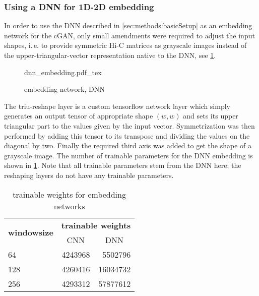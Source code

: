 \subsubsection{Using a DNN for 1D-2D embedding} \label{sec:methods:dnn-embedding}
In order to use the DNN described in \cref{sec:methods:basicSetup} as an embedding network
for the cGAN, only small amendments were required to adjust the input shapes,
i.\,e. to provide symmetric Hi-C matrices as grayscale images instead of the upper-triangular-vector representation
native to the DNN, see \cref{fig:methods:dnn-embedding}.
\begin{figure}[p]
    \scriptsize
    \centering
    {dnn_embedding.pdf_tex}
    \caption{embedding network, DNN} \label{fig:methods:dnn-embedding}
\end{figure}
The triu-reshape layer is a custom tensorflow network layer which simply generates an output tensor
of appropriate shape $(w,w)$ and sets its upper triangular part to the values given by the input vector.
Symmetrization was then performed by adding this tensor to its transpose and dividing the values on the diagonal by two.
Finally the required third axis was added to get the shape of a grayscale image.
The number of trainable parameters for the DNN embedding is shown in \cref{tab:methods:embedding_network_params}.
Note that all trainable parameters stem from the DNN here; the reshaping layers do not have any trainable parameters.
\begin{table}[htbp]
\centering
\begin{tabular}{lrr}
\hline
\multicolumn{1}{c}{\multirow{2}{*}{\textbf{windowsize}}} & \multicolumn{2}{c}{\textbf{trainable weights}}    \\
\multicolumn{1}{c}{}                                     & \multicolumn{1}{c}{CNN} & \multicolumn{1}{c}{DNN} \\ \hline
64                                                       & 4243968                 & 5502796                 \\
128                                                      & 4260416                 & 16034732                \\
256                                                      & 4293312                 & 57877612                \\ \hline
\end{tabular}
\caption{trainable weights for embedding networks}\label{tab:methods:embedding_network_params}
\end{table}

